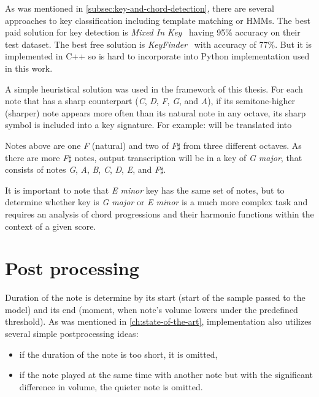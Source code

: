 As was mentioned in \cref{subsec:key-and-chord-detection}, there are several approaches to key classification including
template matching or \acp{HMM}. The best paid solution for key detection is \textit{Mixed In Key}~\cite{mixed-in-keys}
having 95\% accuracy on their test dataset. The best free solution is \textit{KeyFinder}~\cite{key-finder} with accuracy
of 77\%. But it is implemented in C++ so is hard to incorporate into Python implementation used in this work.

A simple heuristical solution was used in the framework of this thesis. For each note that has a sharp counterpart
(\textit{C}, \textit{D}, \textit{F}, \textit{G}, and \textit{A}), if its semitone-higher (sharper) note appears more
often than its natural note in any octave, its sharp symbol is included into a key signature. For example:
will be translated into

Notes above are one \textit{F} (natural) and two of \textit{F}$\sharp$ from three different octaves. As there are more
\textit{F}$\sharp$ notes, output transcription will be in a key of \textit{G major}, that consists of notes \textit{G},
\textit{A}, \textit{B}, \textit{C}, \textit{D}, \textit{E}, and \textit{F}$\sharp$.

It is important to note that \textit{E minor} key has the same set of notes, but to determine whether key is
\textit{G major} or \textit{E minor} is a much more complex task and requires an analysis of chord progressions and
their harmonic functions within the context of a given score.

\section{Post processing}\label{sec:post-processing}

Duration of the note is determine by its start (start of the sample passed to the model) and its end (moment, when
note's volume lowers under the predefined threshold). As was mentioned in \cref{ch:state-of-the-art}, implementation
also utilizes several simple postprocessing ideas:
\begin{itemize}
	\item if the duration of the note is too short, it is omitted,
	\item if the note played at the same time with another note but with the significant difference in volume,
	the quieter note is omitted.
\end{itemize}

